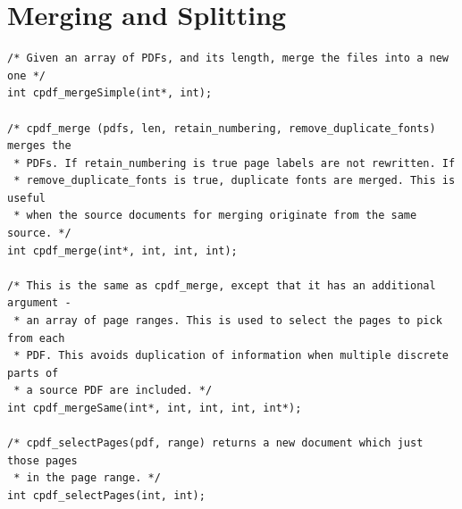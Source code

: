 \documentclass[a4paper]{memoir}
\begin{document}
\chapter{Merging and Splitting}
\begin{small}
\begin{lstlisting}
/* Given an array of PDFs, and its length, merge the files into a new one */
int cpdf_mergeSimple(int*, int);

/* cpdf_merge (pdfs, len, retain_numbering, remove_duplicate_fonts) merges the
 * PDFs. If retain_numbering is true page labels are not rewritten. If
 * remove_duplicate_fonts is true, duplicate fonts are merged. This is useful
 * when the source documents for merging originate from the same source. */
int cpdf_merge(int*, int, int, int);

/* This is the same as cpdf_merge, except that it has an additional argument -
 * an array of page ranges. This is used to select the pages to pick from each
 * PDF. This avoids duplication of information when multiple discrete parts of
 * a source PDF are included. */
int cpdf_mergeSame(int*, int, int, int, int*);

/* cpdf_selectPages(pdf, range) returns a new document which just those pages
 * in the page range. */
int cpdf_selectPages(int, int);

\end{lstlisting}
\end{small}
\end{document}
